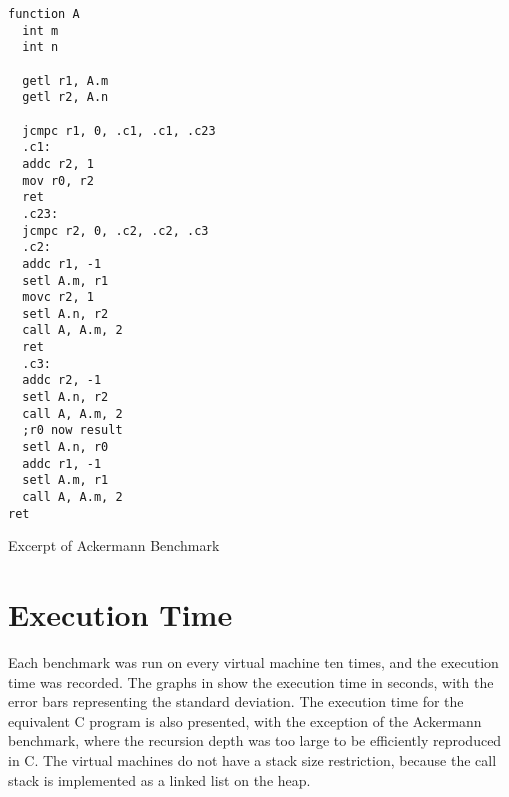 	\begin{myfigure}
		\begin{lstlisting}
function A
  int m
  int n

  getl r1, A.m
  getl r2, A.n

  jcmpc r1, 0, .c1, .c1, .c23
  .c1:
  addc r2, 1
  mov r0, r2
  ret
  .c23:
  jcmpc r2, 0, .c2, .c2, .c3
  .c2:
  addc r1, -1
  setl A.m, r1
  movc r2, 1
  setl A.n, r2
  call A, A.m, 2
  ret
  .c3:
  addc r2, -1
  setl A.n, r2
  call A, A.m, 2
  ;r0 now result
  setl A.n, r0
  addc r1, -1
  setl A.m, r1
  call A, A.m, 2
ret
		\end{lstlisting}
		\caption{Excerpt of Ackermann Benchmark}
		\label{fig:ackermann}
	\end{myfigure}
	
	\section{Execution Time}
		Each benchmark was run on every virtual machine ten times, and the execution time was recorded. The graphs in  show the execution time in seconds, with the error bars representing the standard deviation. The execution time for the equivalent C program is also presented, with the exception of the Ackermann benchmark, where the recursion depth was too large to be efficiently reproduced in C. The virtual machines do not have a stack size restriction, because the call stack is implemented as a linked list on the heap.
	
